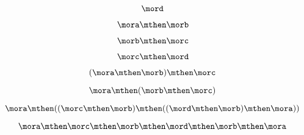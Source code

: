 {\begin{forslides}
        \begin{equation}
            \label{eq:07}
            \mord
        \end{equation}
        
        \begin{equation}
            \label{eq:08}
            \mora \mthen \morb
        \end{equation}
        
        \begin{equation}
            \label{eq:09}
            \morb \mthen \morc
        \end{equation}
        
        \begin{equation}
            \label{eq:10}
            \morc \mthen \mord
        \end{equation}
        
        \begin{equation}
            \label{eq:11}
            (\mora \mthen \morb) \mthen \morc
        \end{equation}
        
        \begin{equation}
            \label{eq:12}
            \mora \mthen  (\morb \mthen \morc )
        \end{equation}
        
        \begin{equation}
            \label{eq:13}
            \mora \mthen  ((\morc \mthen \morb ) \mthen (( \mord \mthen \morb ) \mthen \mora ))
        \end{equation}
        
        \begin{equation}
            \label{eq:14}
            \mora \mthen  \morc \mthen \morb  \mthen \mord \mthen \morb  \mthen \mora
        \end{equation}
        

\end{forslides}}
